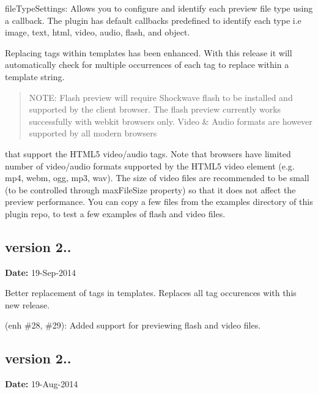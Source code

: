 \begin{DoxyItemize}
\item {\ttfamily file\+Type\+Settings}\+: Allows you to configure and identify each preview file type using a callback. The plugin has default callbacks predefined to identify each type i.\+e {\ttfamily image}, {\ttfamily text}, {\ttfamily html}, {\ttfamily video}, {\ttfamily audio}, {\ttfamily flash}, and {\ttfamily object}.
\item Replacing tags within templates has been enhanced. With this release it will automatically check for multiple occurrences of each tag to replace within a template string.
\end{DoxyItemize}

\begin{quote}
N\+O\+TE\+: Flash preview will require Shockwave flash to be installed and supported by the client browser. The flash preview currently works successfully with webkit browsers only. Video \& Audio formats are however supported by all modern browsers \end{quote}
that support the H\+T\+M\+L5 {\ttfamily video}/{\ttfamily audio} tags. Note that browsers have limited number of video/audio formats supported by the H\+T\+M\+L5 video element (e.\+g. mp4, webm, ogg, mp3, wav). The size of video files are recommended to be small (to be controlled through {\ttfamily max\+File\+Size} property) so that it does not affect the preview performance. You can copy a few files from the {\ttfamily examples} directory of this plugin repo, to test a few examples of flash and video files.

\subsection*{version 2..}

{\bfseries Date\+:} 19-\/\+Sep-\/2014


\begin{DoxyItemize}
\item Better replacement of tags in templates. Replaces all tag occurences with this new release.
\item (enh \#28, \#29)\+: Added support for previewing flash and video files.
\end{DoxyItemize}

\subsection*{version 2..}

{\bfseries Date\+:} 19-\/\+Aug-\/2014


